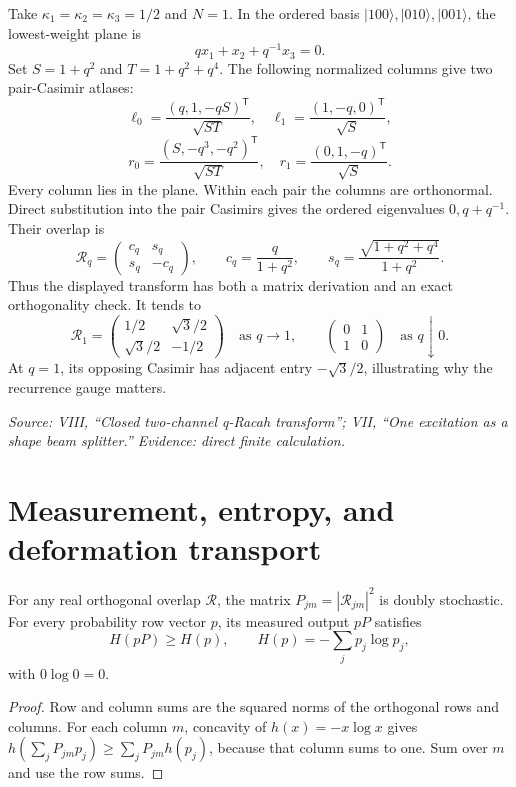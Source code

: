 Take $\kappa_1=\kappa_2=\kappa_3=1/2$ and $N=1$. In the ordered basis $|100\rangle,|010\rangle,|001\rangle$, the lowest-weight plane is
\[
qx_1+x_2+q^{-1}x_3=0.
\]
Set $S=1+q^2$ and $T=1+q^2+q^4$. The following normalized columns give two pair-Casimir atlases:
\[
\ell_0=\frac{(q,1,-qS)^{\mathsf T}}{\sqrt{ST}},
\quad\ell_1=\frac{(1,-q,0)^{\mathsf T}}{\sqrt S},
\]
\[
r_0=\frac{(S,-q^3,-q^2)^{\mathsf T}}{\sqrt{ST}},
\quad r_1=\frac{(0,1,-q)^{\mathsf T}}{\sqrt S}.
\]
Every column lies in the plane. Within each pair the columns are orthonormal. Direct substitution into the pair Casimirs gives the ordered eigenvalues $0,q+q^{-1}$. Their overlap is
\[
\mathcal R_q=
\begin{pmatrix}c_q&s_q\\s_q&-c_q\end{pmatrix},
\qquad c_q=\frac{q}{1+q^2},\qquad
s_q=\frac{\sqrt{1+q^2+q^4}}{1+q^2}.
\]
Thus the displayed transform has both a matrix derivation and an exact orthogonality check. It tends to
\[
\mathcal R_1=\begin{pmatrix}1/2&\sqrt3/2\\\sqrt3/2&-1/2\end{pmatrix}
\quad\text{as }q\to1,
\qquad
\begin{pmatrix}0&1\\1&0\end{pmatrix}
\quad\text{as }q\downarrow0.
\]
At $q=1$, its opposing Casimir has adjacent entry $-\sqrt3/2$, illustrating why the recurrence gauge matters.

\noindent\emph{Source: VIII, ``Closed two-channel q-Racah transform''; VII, ``One excitation as a shape beam splitter.'' Evidence: direct finite calculation.}

\section{Measurement, entropy, and deformation transport}

\begin{theorem}
For any real orthogonal overlap $\mathcal R$, the matrix $P_{jm}=|\mathcal R_{jm}|^2$ is doubly stochastic. For every probability row vector $p$, its measured output $pP$ satisfies
\[
H(pP)\geq H(p),\qquad H(p)=-\sum_jp_j\log p_j,
\]
with $0\log0=0$.
\end{theorem}

\begin{proof}
Row and column sums are the squared norms of the orthogonal rows and columns. For each column $m$, concavity of $h(x)=-x\log x$ gives
$h(\sum_jP_{jm}p_j)\geq\sum_jP_{jm}h(p_j)$,
because that column sums to one. Sum over $m$ and use the row sums.
\end{proof}

